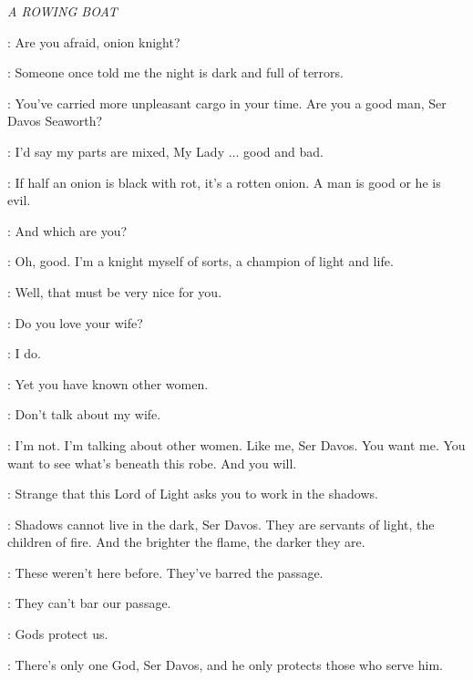\scene

\textit{A ROWING BOAT} 


\MELISANDRE: Are you afraid, onion knight? 

\DAVOS: Someone once told me the night is dark and full of terrors. 

\MELISANDRE: You've carried more unpleasant cargo in your time. Are you a good man, Ser Davos Seaworth? 

\DAVOS: I'd say my parts are mixed, My Lady $\ldots$ good and bad. 

\MELISANDRE: If half an onion is black with rot, it's a rotten onion. A man is good or he is evil. 

\DAVOS: And which are you?

\MELISANDRE: Oh, good. I'm a knight myself of sorts, a champion of light and life. 

\DAVOS: Well, that must be very nice for you. 

\MELISANDRE: Do you love your wife? 

\DAVOS: I do. 

\MELISANDRE: Yet you have known other women. 

\DAVOS: Don't talk about my wife. 


\MELISANDRE: I'm not. I'm talking about other women. Like me, Ser Davos. You want me. You want to see what's beneath this robe. And you will. 

\DAVOS: Strange that this Lord of Light asks you to work in the shadows. 


\MELISANDRE: Shadows cannot live in the dark, Ser Davos. They are servants of light, the children of fire. And the brighter the flame, the darker they are. 


\DAVOS: These weren't here before. They've barred the passage. 

\MELISANDRE: They can't bar our passage. 


\DAVOS: Gods protect us. 

\MELISANDRE: There's only one God, Ser Davos, and he only protects those who serve him. 




